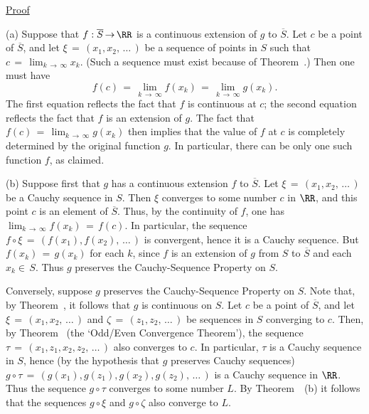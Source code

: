 \V

        \underline{Proof}

        (a) Suppose that $f:\overline{S} \,{\rightarrow}\, {\RR}$ is a continuous extension of $g$ to $\overline{S}$.
    Let $c$ be a point of $\overline{S}$, and let ${\xi} \,=\, (x_{1},x_{2},\,{\ldots}\,)$ be a sequence of points in $S$ such that $c \,=\, \lim_{k \,{\rightarrow}\, {\infty}} x_{k}$.
    (Such a sequence must exist because of Theorem~.)
    Then one must have
        \begin{equation}
        \label{EqnF.30}
        f(c) \,=\, \lim_{k \,{\rightarrow}\, {\infty}} f(x_{k}) \,=\, \lim_{k \,{\rightarrow}\, {\infty}} g(x_{k}).
        \end{equation}
    The first equation reflects the fact that $f$ is continuous at $c$; the second equation reflects the fact that $f$ is an extension of $g$.
    The fact that $f(c) \,=\, \lim_{k \,{\rightarrow}\, {\infty}} g(x_{k})$ then implies that the value of $f$ at $c$ is completely determined by the original function $g$.
    In particular, there can be only one such function $f$, as claimed.

\V

        (b) Suppose first that $g$ has a continuous extension $f$ to $\overline{S}$.
    Let ${\xi} \,=\, (x_{1},x_{2},\,{\ldots}\,)$ be a Cauchy sequence in $S$.
    Then ${\xi}$ converges to some number $c$ in ${\RR}$, and this point $c$ is an element of $\overline{S}$.
    Thus, by the continuity of $f$, one has $\lim_{k \,{\rightarrow}\, {\infty}} f(x_{k}) \,=\, f(c)$.
    In particular, the sequence $f{\circ}{\xi} \,=\, (f(x_{1}), f(x_{2}),\,{\ldots}\,)$ is convergent, hence it is a Cauchy sequence.
    But $f(x_{k}) \,=\, g(x_{k})$ for each $k$, since $f$ is an extension of $g$ from $S$ to $\overline{S}$ and each $x_{k}{\in}\,S$. 
    Thus $g$ preserves the Cauchy-Sequence Property on $S$.


        Conversely, suppose $g$ preserves the Cauchy-Sequence Property on $S$.
    Note that, by Theorem~, it follows that $g$ is continuous on $S$.
    Let $c$ be a point of $\overline{S}$, and let ${\xi} \,=\, (x_{1}, x_{2},\,{\ldots}\,)$ and ${\zeta} \,=\, (z_{1}, z_{2}, \,{\dots}\,)$ be sequences in $S$ converging to $c$.
    Then, by Theorem~ (the `Odd/Even Convergence Theorem'),
    the sequence ${\tau} \,=\, (x_{1},z_{1},x_{2},z_{2},\,{\ldots}\,)$ also converges to $c$.
    In particular, ${\tau}$ is a Cauchy sequence in $S$, hence (by the hypothesis that $g$ preserves Cauchy sequences) $g{\circ}{\tau} \,=\, (g(x_{1}),g(z_{1}),g(x_{2}),g(z_{2}),\,{\ldots}\,)$ is a Cauchy sequence in ${\RR}$.
    Thus the sequence $g{\circ}{\tau}$ converges to some number $L$.
    By Theorem~~(b) it follows that the sequences $g{\circ}{\xi}$ and $g{\circ}{\zeta}$ also converge to $L$.

